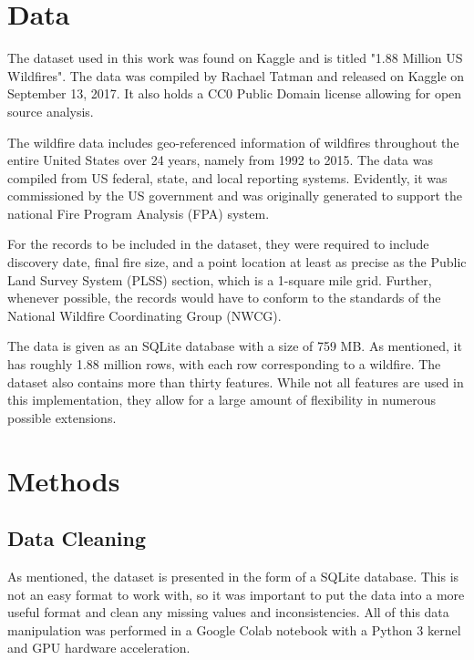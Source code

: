 \documentclass[conference]{IEEEtran}
\begin{document}
\section{Data}
The dataset used in this work was found on Kaggle and is titled "1.88 Million US Wildfires". The data was compiled by Rachael Tatman and released on Kaggle on September 13, 2017. It also holds a CC0 Public Domain license allowing for open source analysis. \par

The wildfire data includes geo-referenced information of wildfires throughout the entire United States over 24 years, namely from 1992 to 2015. The data was compiled from US federal, state, and local reporting systems. Evidently, it was commissioned by the US government and was originally generated to support the national Fire Program Analysis (FPA) system. \par

For the records to be included in the dataset, they were required to include discovery date, final fire size, and a point location at least as precise as the Public Land Survey System (PLSS) section, which is a 1-square mile grid. Further, whenever possible, the records would have to conform to the standards of the National Wildfire Coordinating Group (NWCG). \par

The data is given as an SQLite database with a size of 759 MB. As mentioned, it has roughly 1.88 million rows, with each row corresponding to a wildfire. The dataset also contains more than thirty features. While not all features are used in this implementation, they allow for a large amount of flexibility in numerous possible extensions. \par

\section{Methods}
\subsection{Data Cleaning}
As mentioned, the dataset is presented in the form of a SQLite database. This is not an easy format to work with, so it was important to put the data into a more useful format and clean any missing values and inconsistencies. All of this data manipulation was performed in a Google Colab notebook with a Python 3 kernel and GPU hardware acceleration. \par
\end{document}
